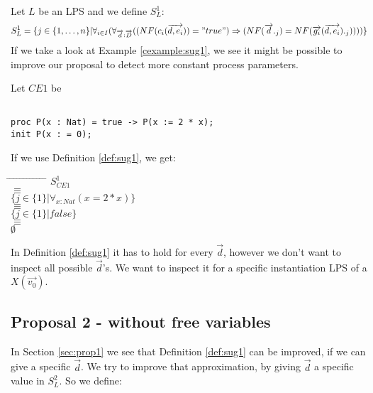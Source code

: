 \index{}\documentclass[a4paper,10pt]{article}
\theoremstyle{plain}
\theoremstyle{definition}
\newcommand{\ovr}{\overrightarrow}
\newcommand{\pps}{process parameters}
\newcommand{\tab}{\hspace*{5.mm} \= \hspace*{5.mm} \= \hspace*{5.mm} \= \hspace*{5.mm} \= \hspace*{5.mm} \= \hspace*{5.mm}  \= \hspace*{5.mm}  \= \hspace*{5.mm}  \= \hspace*{5.mm} \= \hspace*{5.mm} \= \hspace*{5.mm}  \= \hspace*{5.mm}  \= \hspace*{5.mm}\kill}
\begin{document}
\begin{defn} \label{def:sug1} Let $L$ be an LPS and we define $S_L^1$:
\begin{displaymath}
S_L^1 =
\lbrace
j \in \lbrace 1, \ldots , n \rbrace \vert \forall_{i\in I} (\forall_{\ovr{d}: \ovr{D}}((NF(c_i(\ovr{d,e_i})) = "true")  \Rightarrow (NF(\ovr{d}._j) = NF(\ovr{g_i}(\ovr{d,e_i})._j))))\rbrace
\end{displaymath}
If we take a look at Example \ref{cexample:sug1}, we see it might be possible to improve our proposal to detect more constant \pps .
\begin{example}Let $CE1$ be \label{cexample:sug1}\begin{verbatim}

proc P(x : Nat) = true -> P(x := 2 * x);
init P(x : = 0);

\end{verbatim}
\end{example}
\begin{flushleft}
If we use Definition \ref{def:sug1}, we get:\\
\end{flushleft}
\begin{tabbing}
\tab
\> \> $S_{CE1}^1$\\
\> $\equiv$\\
\> \> $\lbrace j \in \lbrace 1 \rbrace \vert \forall_{x : Nat}( x = 2 \ast x ) \rbrace $\\
\> $\equiv$ \\
\> \> $\lbrace j \in \lbrace 1 \rbrace \vert false \rbrace $\\
\> $\equiv$ \\
\> \> $\emptyset$ \\
\end{tabbing}
In Definition \ref{def:sug1} it has to hold for every $\ovr{d}$, however
we don't want to inspect all possible $\ovr{d}$'s. We want to inspect it for a specific instantiation LPS of a $X(\ovr{v_0})$.
\end{defn}

\subsection{Proposal 2 - without free variables}
In Section \ref{sec:prop1} we see that Definition \ref{def:sug1} can be improved, if we can give a specific $\ovr{d}$. We try to improve that approximation, by giving $\ovr{d}$ a specific value in $S_L^2$. So we define:
\end{document}
